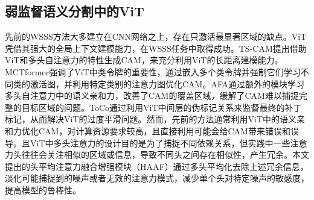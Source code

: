 \begin{CJK*}{UTF8}{zhhei}
    \subsection{弱监督语义分割中的ViT}
\end{CJK*}

先前的WSSS方法大多建立在CNN网络之上，存在只激活最显著区域的缺点。ViT\cite{02dosovitskiy2020image}凭借其强大的全局上下文建模能力，在WSSS任务中取得成功。TS-CAM\cite{11gao2021ts}提出借助ViT和多头自注意力的特性生成CAM，来充分利用ViT的长距离建模能力。MCTformer\cite{12xu2022multi}强调了ViT中类令牌的重要性，通过嵌入多个类令牌并强制它们学习不同类的激活图，并利用特定类别的注意力图优化CAM。AFA\cite{13ru2022learning}通过额外的模块学习多头自注意力中的语义亲和力，改善了CAM的覆盖区域，缓解了CAM难以捕捉完整的目标区域的问题。ToCo\cite{03ru2023token}通过利用ViT中间层的伪标记关系来监督最终的补丁标记，从而解决ViT的过度平滑问题。然而，先前的方法通常利用ViT中的语义亲和力优化CAM，对计算资源要求较高，且直接利用可能会给CAM带来错误和误导。且ViT中多头注意力的设计目的是为了捕捉不同依赖关系，但实践中一些注意力头往往会关注相似的区域或信息，导致不同头之间存在相似性，产生冗余。本文提出的头平均注意力融合增强模块（HAAF）通过多头平均化去除上述冗余信息，淡化可能捕捉到的噪声或者无效的注意力模式，减少单个头对特定噪声的敏感度，提高模型的鲁棒性。